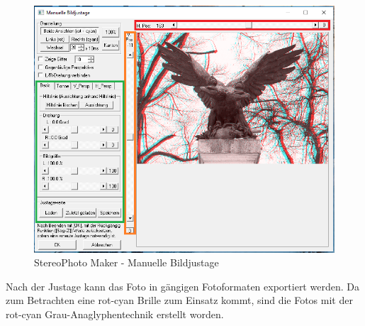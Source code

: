 \documentclass[liststotoc,bibtotoc,fontsize=14pt,]{scrreprt}
\begin{document}
		\begin{figure}[H]
			\includegraphics[width=\linewidth]{img/steps/step4.png}
			\caption{StereoPhoto Maker - Manuelle Bildjustage}
			\label{img:maker_manual}
		\end{figure}
	
		Nach der Justage kann das Foto in gängigen Fotoformaten exportiert werden. Da zum Betrachten eine rot-cyan Brille zum Einsatz kommt, sind die Fotos mit der rot-cyan Grau-Anaglyphentechnik erstellt worden.

	
\end{document}
